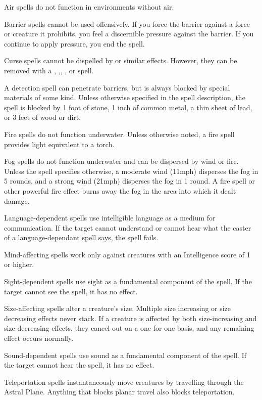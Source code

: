 \begin{itemize*}
\item Air spells do not function in environments without air.
\item Barrier spells cannot be used offensively. If you force the barrier against a force or creature it prohibits, you feel a discernible pressure against the barrier. If you continue to apply pressure, you end the spell.
\item Curse spells cannot be dispelled by  or similar effects. However, they can be removed with a , ,, , or  spell.
\item A detection spell can penetrate barriers, but is always blocked by special materials of some kind. Unless otherwise specified in the spell description, the spell is blocked by 1 foot of stone, 1 inch of common metal, a thin sheet of lead, or 3 feet of wood or dirt.
\item Fire spells do not function underwater. Unless otherwise noted, a fire spell provides light equivalent to a torch.
\item Fog spells do not function underwater and can be dispersed by wind or fire. Unless the spell specifies otherwise, a moderate wind (11\add mph) disperses the fog in 5 rounds, and a strong wind (21\add mph) disperses the fog in 1 round. A fire spell or other powerful fire effect burns away the fog in the area into which it dealt damage.
\item Language-dependent spells use intelligible language as a medium for communication. If the target cannot understand or cannot hear what the caster of a language-dependant spell says, the spell fails.
\item Mind-affecting spells work only against creatures with an Intelligence score of 1 or higher.
\item Sight-dependent spells use sight as a fundamental component of the spell. If the target cannot see the spell, it has no effect.
\item Size-affecting spells alter a creature's size. Multiple size increasing or size decreasing effects never stack. If a creature is affected by both size-increasing and size-decreasing effects, they cancel out on a one for one basis, and any remaining effect occurs normally.
\item Sound-dependent spells use sound as a fundamental component of the spell. If the target cannot hear the spell, it has no effect.
\item Teleportation spells instantaneously move creatures by travelling through the Astral Plane. Anything that blocks planar travel also blocks teleportation.

\end{itemize*}
